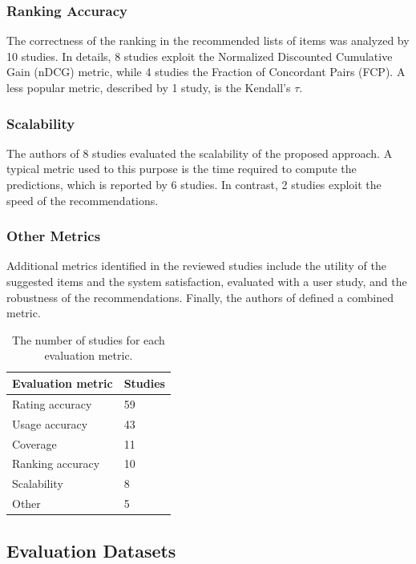 \subsubsection{Ranking Accuracy}

The correctness of the ranking in the recommended lists of items was analyzed by 10 studies. In details, 8 studies exploit the Normalized Discounted Cumulative Gain (nDCG) metric, while 4 studies the Fraction of Concordant Pairs (FCP). A less popular metric, described by 1 study, is the Kendall's $\tau$.

\subsubsection{Scalability}

The authors of 8 studies evaluated the scalability of the proposed approach. A typical metric used to this purpose is the time required to compute the predictions, which is reported by 6 studies. In contrast, 2 studies exploit the speed of the recommendations.

\subsubsection{Other Metrics}

Additional metrics identified in the reviewed studies include the utility of the suggested items and the system satisfaction, evaluated with a user study, and the robustness of the recommendations. Finally, the authors of  defined a combined metric.

\begin{table}
\centering
\begin{tabular}{@{}ll@{}}
\toprule
Evaluation metric & Studies \\ \midrule
Rating accuracy   & 59      \\
Usage accuracy    & 43      \\
Coverage          & 11      \\
Ranking accuracy  & 10      \\
Scalability       & 8       \\
Other             & 5       \\ \bottomrule
\end{tabular}
\caption[Studies per evaluation metric]{The number of studies for each evaluation metric.}
\label{mcr:tab:metrics}
\end{table}

\subsection{Evaluation Datasets}
\label{mcr:sec:datasets}

